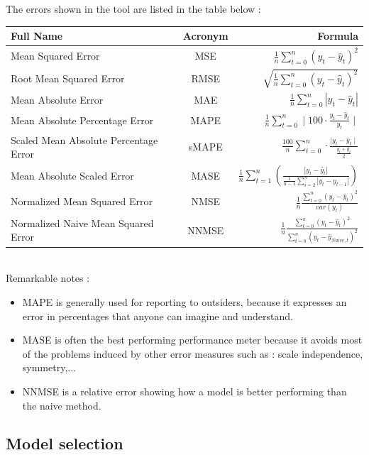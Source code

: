 \documentclass[11pt,a4paper,oneside]{book}
\begin{document}
The errors shown in the tool are listed in the table below  : \\


\begin{tabular}{|l|c|r|}
  \hline
   Full Name & Acronym & Formula \\
  \hline
  Mean Squared Error & MSE & $\frac{1}{n}\sum_{t=0}^n (y_t - \hat{y}_t)^2$ \\
  Root Mean Squared Error & RMSE & $\sqrt{\frac{1}{n} \sum_{t=0}^n (y_t - \hat{y}_t)^2}$ \\
  Mean Absolute Error & MAE & $\frac{1}{n} \sum_{t=0}^n |y_t - \hat{y}_t|$ \\
  Mean Absolute Percentage Error & MAPE & $\frac{1}{n} \sum_{t=0}^n  \mid 100 \cdot \frac{y_t - \hat{y}_t}{y_t}\mid$ \\
  Scaled Mean Absolute Percentage Error & sMAPE & $\frac{100}{n} \sum_{t=0}^n \cdot \frac{\mid y_t - \hat{y}_t\mid}{\frac{y_t+\hat{y}_t}{2}}$ \\
  Mean Absolute Scaled Error & MASE & $\frac{1}{n}\sum_{t=1}^n \left( \frac{\left| y_t - \hat{y}_t \right|}{\frac{1}{n-1}\sum_{i=2}^n \left| y_t-y_{t-1} \right|}\right)$ \\
  Normalized Mean Squared Error & NMSE & $\frac{1}{n}\frac{\sum_{t=0}^{n} (y_t-\hat{y}_t)^2}{var(y_t)}$ \\
  Normalized Naive Mean Squared Error & NNMSE & $\frac{1}{n}\frac{\sum_{t=0}^{n} (y_t-\hat{y}_t)^2}{\sum_{t=0}^{n} (y_t-\hat{y}_{Naive,t})^2}$ \\
  \hline
\end{tabular}
\\



Remarkable notes : 

\begin{itemize}
    \item MAPE is generally used for reporting to outsiders, because it expresses an error in percentages that anyone can imagine and understand.
    \item MASE is often the best performing performance meter because it avoids most of the problems induced by other error measures such as : scale independence, symmetry,... 
    \item NNMSE is a relative error showing how a model is better performing than the naive method. 
\end{itemize}



\subsection{Model selection}
\end{document}
